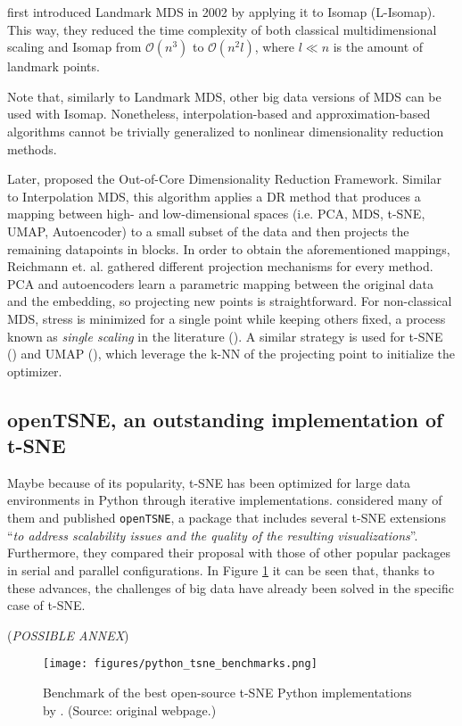 \cite{Silva2002} first introduced Landmark MDS in 2002 by applying it to Isomap (L-Isomap). This way, they reduced the time complexity of both classical multidimensional scaling and Isomap from $\mathcal{O}(n^3)$ to $\mathcal{O}(n^2l)$, where $l \ll n$ is the amount of landmark points.

Note that, similarly to Landmark MDS, other big data versions of MDS can be used with Isomap. Nonetheless, interpolation-based and approximation-based algorithms cannot be trivially generalized to nonlinear dimensionality reduction methods.

Later, \cite{Reichmann2024} proposed the Out-of-Core Dimensionality Reduction Framework. Similar to Interpolation MDS, this algorithm applies a DR method that produces a mapping between high- and low-dimensional spaces (i.e. PCA, MDS, t-SNE, UMAP, Autoencoder) to a small subset of the data and then projects the remaining datapoints in blocks. In order to obtain the aforementioned mappings, Reichmann et. al. gathered different projection mechanisms for every method. PCA and autoencoders learn a parametric mapping between the original data and the embedding, so projecting new points is straightforward. For non-classical MDS, stress is minimized for a single point while keeping others fixed, a process known as \textit{single scaling} in the literature (\cite{Basalaj1999}). A similar strategy is used for t-SNE (\cite{Zhang2021}) and UMAP (\cite{McInnes2018a}), which leverage the k-NN of the projecting point to initialize the optimizer.

\subsection{openTSNE, an outstanding implementation of t-SNE}

Maybe because of its popularity, t-SNE has been optimized for large data environments in Python through iterative implementations. \cite{Policar2024} considered many of them and published \verb|openTSNE|, a package that includes several t-SNE extensions \enquote{\textit{to address scalability issues and the quality of the resulting visualizations}}. Furthermore, they compared their proposal with those of other popular packages in serial and parallel configurations. In Figure \ref{fig:python_tsne_benchmarks} it can be seen that, thanks to these advances, the challenges of big data have already been solved in the specific case of t-SNE.

(\textit{POSSIBLE ANNEX})

\begin{figure}[ht]
    \centering
    \texttt{[image: figures/python\_tsne\_benchmarks.png]}
    \caption{Benchmark of the best open-source t-SNE Python implementations by \cite{Poličar2023}. (Source: original webpage.)}
    \label{fig:python_tsne_benchmarks}
\end{figure}